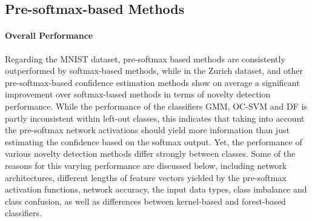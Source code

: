 \documentclass[10pt]{article}
\begin{document}
\subsection{Pre-softmax-based Methods}
\paragraph{Overall Performance}  Regarding the \gls{MNIST} dataset, pre-softmax based methods are consistently outperformed by softmax-based methods, while in the Zurich dataset,  and other pre-softmax-based confidence estimation methods show on average a significant improvement over softmax-based methods in terms of novelty detection performance. While the performance of the classifiers \gls{GMM}, \gls{OC-SVM} and \gls{DF} is partly inconsistent within left-out classes, this indicates that taking into account the pre-softmax network activations should yield more information than just estimating the confidence based on the softmax output. Yet, the performance of various novelty detection methods differ strongly between classes. Some of the reasons for this varying performance are discussed below, including network architectures, different lengths of feature vectors yielded by the pre-softmax activation functions, network accuracy, the input data types, class imbalance and class confusion, as well as differences between kernel-based and forest-based classifiers.

\end{document}
